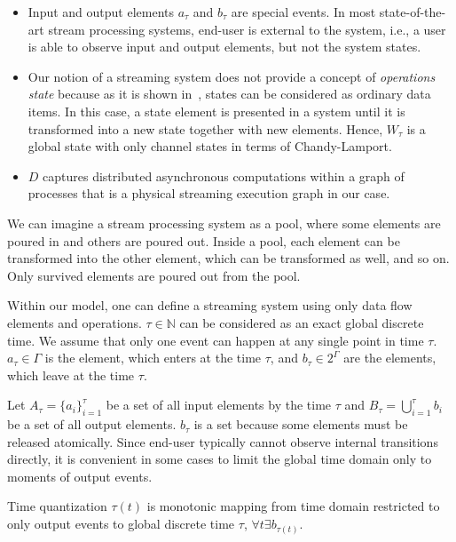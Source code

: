 \begin{itemize}
    \item Input and output elements $a_\tau$ and $b_\tau$ are special events. In most state-of-the-art stream processing systems, end-user is external to the system, i.e., a user is able to observe input and output elements, but not the system states.
    \item Our notion of a streaming system does not provide a concept of {\em operations state} because as it is shown in~\cite{we2018adbis}, states can be considered as ordinary data items. In this case, a state element is presented in a system until it is transformed into a new state together with new elements. Hence, $W_\tau$ is a global state with only channel states in terms of Chandy-Lamport.
    \item $D$ captures distributed asynchronous computations within a graph of processes that is a physical streaming execution graph in our case. 
\end{itemize}

We can imagine a stream processing system as a pool, where some elements are poured in and others are poured out. Inside a pool, each element can be transformed into the other element, which can be transformed as well, and so on. Only survived elements are poured out from the pool. 

Within our model, one can define a streaming system using only data flow elements and operations. $\tau\in{\mathbb{N}}$ can be considered as an exact global discrete time. We assume that only one event can happen at any single point in time $\tau$. $a_\tau\in{\Gamma}$ is the element, which enters at the time $\tau$, and $b_\tau\in{2^\Gamma}$ are the elements, which leave at the time $\tau$. 

Let $A_{\tau}=\{a_i\}^{\tau}_{i=1}$ be a set of all input elements by the time $\tau$ and ${B}_\tau=\bigcup\limits_{i=1}^{\tau}{b_i}$ be a set of all output elements. $b_\tau$ is a set because some elements must be released atomically. Since end-user typically cannot observe internal transitions directly, it is convenient in some cases to limit the global time domain only to moments of output events.

\begin{definition}{Time quantization}
$\tau(t)$ is monotonic mapping from time domain restricted to only output events to global discrete time $\tau$, $\forall{t}\exists{b_{\tau(t)}}$.
\end{definition}

